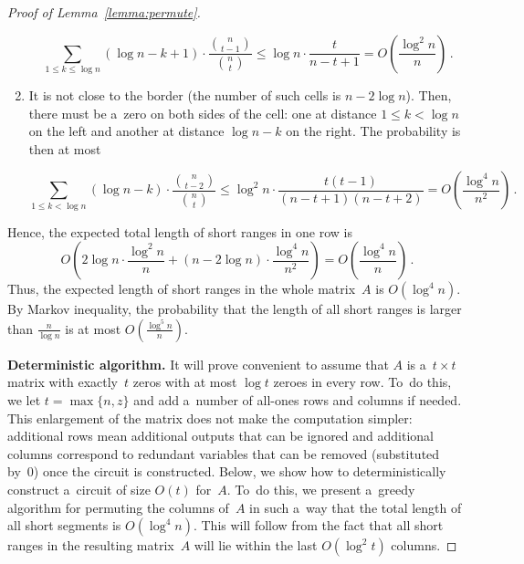 \begin{proof}[Proof of Lemma~\ref{lemma:permute}]
\begin{enumerate}
\[\sum_{1 \le k \le \log n}(\log n - k + 1) \cdot \frac{\binom{n}{t-1}}{\binom{n}{t}} \le \log n \cdot \frac{t}{n-t+1}=O\left(\frac{\log^2n}{n}\right) \, .\]

\item It is not close to the border (the number of such cells is $n-2\log n$).
Then, there must be a~zero on both sides of the cell: one at
distance $1 \le k < \log n$ on the left and another at distance $\log n - k$
on the right. The probability is then at most

\[\sum_{1 \le k < \log n}(\log n - k) \cdot \frac{\binom{n}{t-2}}{\binom{n}{t}} \le \log^2n \cdot \frac{t(t-1)}{(n-t+1)(n-t+2)}=O\left(\frac{\log^4 n}{n^2}\right) \, .\]

\end{enumerate}
Hence, the expected total length of short ranges in one row is
\[O\left( 2\log n \cdot \frac{\log^2 n}{n} + (n-2\log n) \cdot \frac{\log^4 n}{n^2}\right)=O\left(\frac{\log^4 n}{n}\right) \, .\]
Thus, the expected length of short ranges in the whole
matrix~$A$ is $O(\log^4n)$. By Markov inequality, the probability that
the length of all short ranges is larger than $\frac{n}{\log n}$ is
at most $O(\frac{\log^5 n}{n})$.

\textbf{Deterministic algorithm.}
It will prove convenient to assume that $A$ is a~$t \times t$ matrix with
exactly~$t$ zeros with at most $\log t$ zeroes in every row. To~do this, we let
$t=\max\{n, z\}$ and add a~number of all-ones rows and columns if needed. This
enlargement of the matrix does not make the computation simpler: additional rows
mean additional outputs that can be ignored and additional columns correspond to
redundant variables that can be removed (substituted by~0) once the circuit is
constructed. Below, we show how to deterministically construct a~circuit of size
$O(t)$ for~$A$. To~do this, we present a~greedy algorithm for permuting the
columns of~$A$ in such a~way that the total length of all short segments
is $O(\log^4n)$. This will follow from the fact that all short ranges in the
resulting matrix~$A$ will lie within the last $O(\log^2 t)$ columns.



\end{proof}
